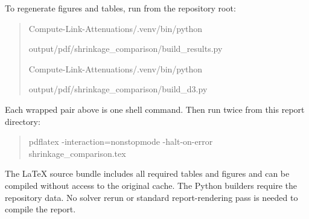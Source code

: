 \documentclass[11pt,a4paper]{article}
\begin{document}
To regenerate figures and tables, run from the repository root:
\begin{quote}\footnotesize\ttfamily
Compute-Link-Attenuations/.venv/bin/python\par
\hspace*{4mm}output/pdf/shrinkage\_comparison/build\_results.py\par
Compute-Link-Attenuations/.venv/bin/python\par
\hspace*{4mm}output/pdf/shrinkage\_comparison/build\_d3.py
\end{quote}
Each wrapped pair above is one shell command. Then run twice from this report directory:
\begin{quote}\small\ttfamily
pdflatex -interaction=nonstopmode -halt-on-error shrinkage\_comparison.tex
\end{quote}
The LaTeX source bundle includes all required tables and figures and can be compiled without access to the original cache. The Python builders require the repository data. No solver rerun or standard report-rendering pass is needed to compile the report.
\end{document}
